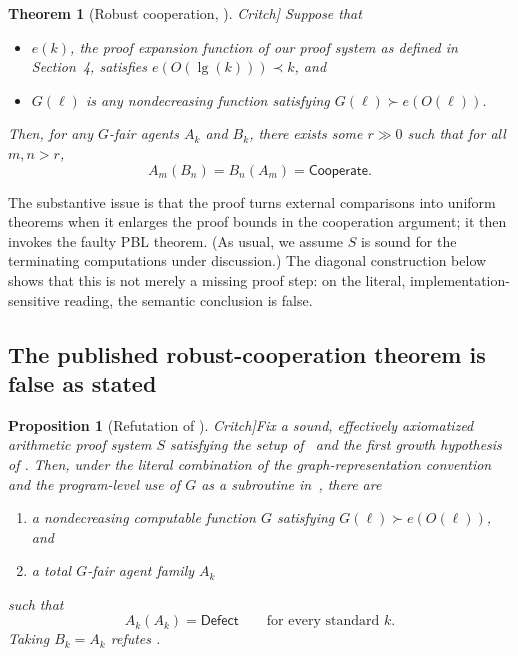 \documentclass[11pt]{article}
\newtheorem{proposition}[theorem]{Proposition}
\newtheorem*{critchcooperation}{Theorem}
\theoremstyle{definition}
\theoremstyle{remark}
\newcommand{\Coop}{\mathsf{Cooperate}}
\newcommand{\Defect}{\mathsf{Defect}}
\newcommand{\CritchCooperationRef}{\cite[Theorem~5.1]{Critch}}
\begin{document}
\begin{critchcooperation}[Robust cooperation, \CritchCooperationRef]
Suppose that
\begin{itemize}[leftmargin=1.8em]
  \item $e(k)$, the proof expansion function of our proof system as defined in Section~4, satisfies $e(O(\lg(k)))\prec k$, and
  \item $G(\ell)$ is any nondecreasing function satisfying $G(\ell)\succ e(O(\ell))$.
\end{itemize}
Then, for any $G$-fair agents $A_k$ and $B_k$, there exists some $r\gg 0$ such that for all $m,n>r$,
\[
  A_m(B_n)=B_n(A_m)=\Coop.
\]
\end{critchcooperation}

The substantive issue is that the proof turns external comparisons into uniform theorems when it enlarges the proof bounds in the cooperation argument; it then invokes the faulty PBL theorem.  (As usual, we assume $S$ is sound for the terminating computations under discussion.)  The diagonal construction below shows that this is not merely a missing proof step: on the literal, implementation-sensitive reading, the semantic conclusion is false.

\subsection{The published robust-cooperation theorem is false as stated}

\begin{proposition}[Refutation of \CritchCooperationRef]\label{prop:coopfailure}
Fix a sound, effectively axiomatized arithmetic proof system $S$ satisfying the setup of~\cite{Critch} and the first growth hypothesis of \CritchCooperationRef.  Then, under the literal combination of the graph-representation convention and the program-level use of $G$ as a subroutine in~\cite{Critch}, there are
\begin{enumerate}[label=\textup{(\roman*)},leftmargin=2.1em]
  \item a nondecreasing computable function $G$ satisfying $G(\ell)\succ e(O(\ell))$, and
  \item a total $G$-fair agent family $A_k$
\end{enumerate}
such that
\[
  A_k(A_k)=\Defect
  \qquad\text{for every standard }k.
\]
Taking $B_k=A_k$ refutes \CritchCooperationRef.
\end{proposition}
\end{document}

